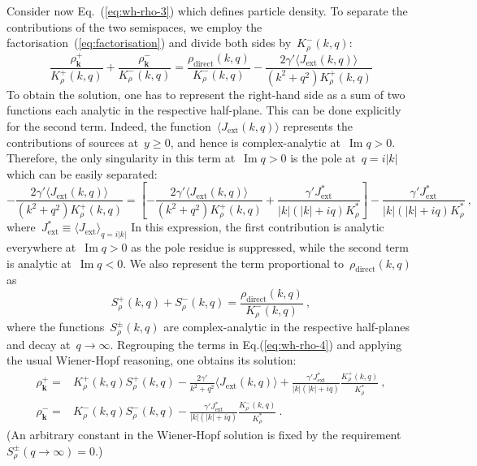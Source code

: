 \documentclass[preprint,aps,eqsecnum]{revtex4-1}
\newcommand{\fplus}[1]{{#1}^{+}}
\newcommand{\fminus}[1]{{#1}^{-}}
\newcommand{\fplusminus}[1]{{#1}^{\pm}}
\renewcommand{\Im}{\mathop{\mathrm{Im}}\nolimits}
\newcommand{\dct}[1]{{#1}_\mathrm{direct}}
\begin{document}
 Consider now Eq.~(\ref{eq:wh-rho-3}) which defines particle  density.
 To separate the contributions of the two semispaces, we employ
 the factorisation~(\ref{eq:factorisation}) and divide both sides
 by~$\fminus{K}_\rho(k, q)$:
 \begin{equation}
   \label{eq:wh-rho-4}
   \frac{\fplus{\rho}_{\bm k}}{\fplus{K}_\rho(k, q)}
    + \frac{\fminus{\rho}_{\bm k}}{\fminus{K}_\rho(k, q)}
    = \frac{\dct{\rho}(k, q)}{\fminus{K}_\rho(k, q)}
    - \frac{2 \gamma' \langle J_{\mathrm{ext}}(k, q) \rangle}{(k^2 + q^2)\fplus{K}_\rho(k, q)}
\end{equation}
To obtain the solution, one has to represent the right-hand side as a sum of
two functions each analytic in the respective half-plane. This can be done
explicitly for the second term. Indeed,
the function~$\langle J_{\mathrm{ext}}(k, q) \rangle$ represents
the contributions of sources at~$y \geq 0$, and hence is complex-analytic
at~$\Im q > 0$. Therefore, the only singularity in this term at~$\Im q > 0$
is the pole at~$q = i |k|$ which can be easily separated:
\begin{equation}
   -\frac{2 \gamma' \langle J_{\mathrm{ext}}(k, q) \rangle}{(k^2 + q^2)\fplus{K}_\rho(k, q)}
   = \left[-\frac{2 \gamma' \langle J_{\mathrm{ext}}(k, q) \rangle}{(k^2 + q^2)\fplus{K}_\rho(k, q)}  + \frac{\gamma' J_\mathrm{ext}^\ast}{|k|(|k| + i q) K_\rho^\ast}\right]
   - \frac{\gamma' J_\mathrm{ext}^\ast}{|k|(|k| + i q) K_\rho^\ast}
   \ ,
\end{equation}
where~$J_\mathrm{ext}^\ast \equiv \langle J_\mathrm{ext} \rangle_{q = i |k|}$
In this expression, the first contribution is analytic everywhere
at~$\Im q > 0$ as the pole residue is suppressed, while
the second term is analytic at~$\Im q < 0$. We also represent the term
proportional to~$\dct{\rho}(k, q)$ as
\begin{equation}
  \label{eq:chi-def}
  \fplus{S}_\rho(k, q) + \fminus{S}_\rho(k, q)
  = \frac{\dct{\rho}(k, q)}{\fminus{K}_\rho(k, q)}
\ ,
\end{equation}
where the functions~$\fplusminus{S}_{\rho}(k, q)$ are complex-analytic
in the respective half-planes and decay at~$q \to \infty$. Regrouping
the terms in Eq.(\ref{eq:wh-rho-4}) and applying the usual Wiener-Hopf
reasoning, one obtains its solution:
\begin{align}
  \label{eq:solution-rho-plus-0}
  \fplus{\rho}_{\bm k} ={}& \fplus{K}_\rho(k, q)  \fplus{S}_\rho(k, q)
   - \frac{2 \gamma'}{k^2 + q^2} \langle J_\mathrm{ext}(k, q) \rangle
   + \frac{\gamma'  J_\mathrm{ext}^\ast}{|k|(|k| + iq)}
     \frac{\fplus{K}_\rho(k, q)}{K_\rho^\ast}
   \ ,
   \\
   \label{eq:solution-rho-minus}
   \fminus{\rho}_{\bm k} = {}& \fminus{K}_\rho(k, q) \fminus{S}_\rho(k, q)
   - \frac{\gamma' J_\mathrm{ext}^\ast}{|k|(|k| + iq)}\frac{\fminus{K}_\rho(k, q)}{K_\rho^\ast}
   \ .
\end{align}
(An arbitrary constant in the Wiener-Hopf solution is fixed
by the requirement~$\fplusminus{S}_{\rho}(q\to \infty) = 0$.)
\end{document}
